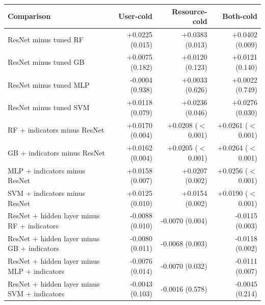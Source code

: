 \begin{tabular}{lrrr}
\toprule
Comparison & User-cold & Resource-cold & Both-cold \\
\midrule
ResNet minus tuned RF & +0.0225 (0.015) & +0.0383 (0.013) & +0.0402 (0.009) \\
ResNet minus tuned GB & +0.0075 (0.182) & +0.0120 (0.123) & +0.0121 (0.140) \\
ResNet minus tuned MLP & -0.0004 (0.938) & +0.0033 (0.626) & +0.0022 (0.749) \\
ResNet minus tuned SVM & +0.0118 (0.079) & +0.0236 (0.046) & +0.0276 (0.030) \\
\midrule
RF + indicators minus ResNet & +0.0170 (0.004) & +0.0208 ($<$0.001) & +0.0261 ($<$0.001) \\
GB + indicators minus ResNet & +0.0162 (0.004) & +0.0205 ($<$0.001) & +0.0264 ($<$0.001) \\
MLP + indicators minus ResNet & +0.0158 (0.007) & +0.0207 (0.002) & +0.0256 ($<$0.001) \\
SVM + indicators minus ResNet & +0.0125 (0.010) & +0.0154 (0.002) & +0.0190 ($<$0.001) \\
\midrule
ResNet + hidden layer minus RF + indicators & -0.0088 (0.010) & -0.0070 (0.004) & -0.0115 (0.003) \\
ResNet + hidden layer minus GB + indicators & -0.0080 (0.011) & -0.0068 (0.003) & -0.0118 (0.002) \\
ResNet + hidden layer minus MLP + indicators & -0.0076 (0.014) & -0.0070 (0.032) & -0.0111 (0.007) \\
ResNet + hidden layer minus SVM + indicators & -0.0043 (0.103) & -0.0016 (0.578) & -0.0045 (0.214) \\
\bottomrule
\end{tabular}
